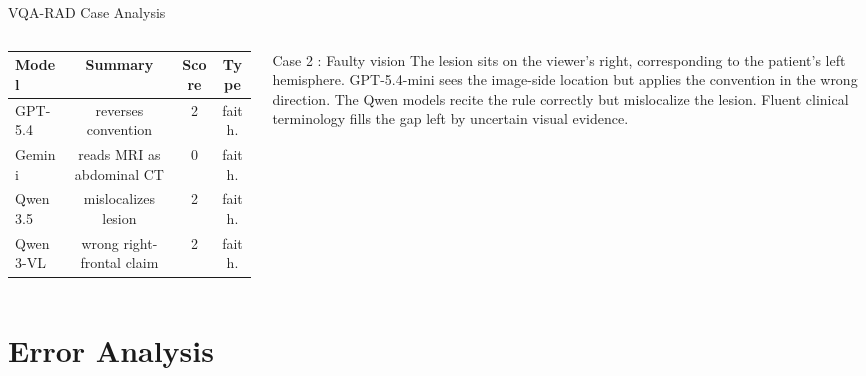 \documentclass[9pt,aspectratio=169]{beamer}
\begin{document}
\begin{frame}{VQA-RAD Case Analysis}
\begin{columns}[T,onlytextwidth]
      \vspace{0.15em}
      \scriptsize
      \setlength{\tabcolsep}{3pt}
      \renewcommand{\arraystretch}{0.84}
      \begin{tabular}{lccc}
        \toprule
        Model & Summary & Score & Type \\
        \midrule
        GPT-5.4 & reverses convention & 2 & faith. \\
        Gemini & reads MRI as abdominal CT & 0 & faith. \\
        Qwen3.5 & mislocalizes lesion & 2 & faith. \\
        Qwen3-VL & wrong right-frontal claim & 2 & faith. \\
        \bottomrule
      \end{tabular}

      \vspace{0.15em}
      \begin{exampleblock}{Case 2 : Faulty vision}
        \footnotesize
        The lesion sits on the viewer's right, corresponding to the
        patient's left hemisphere. GPT-5.4-mini sees the image-side
        location but applies the convention in the wrong direction.
        The Qwen models recite the rule correctly but mislocalize the
        lesion. Fluent clinical terminology fills the gap left by
        uncertain visual evidence.
      \end{exampleblock}
  \end{columns}
\end{frame}

\section{Error Analysis}
\end{document}
